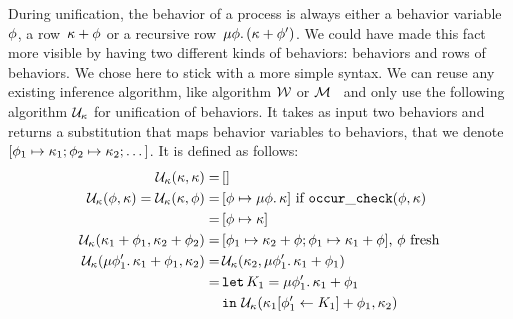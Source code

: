 \documentclass[9pt,preprint]{sigplanconf}
\begin{document}
During unification, the behavior of a process is always either a behavior variable~$\phi$, a row~$\kappa + \phi$ or a recursive row~$\mu \phi.\, (\kappa + \phi')$. We could have made this fact more visible by having two different kinds of behaviors: behaviors and rows of behaviors. We chose here to stick with a more simple syntax. We can reuse any existing inference algorithm, like algorithm $\mathcal{W}$ or $\mathcal{M}$~\cite{Lee:1998a} and only use the following algorithm $\mathcal{U}_{\kappa}$ for unification of behaviors. It takes as input two behaviors and returns a substitution that maps behavior variables to behaviors, that we denote $[\phi_1 \mapsto \kappa_1; \phi_2 \mapsto \kappa_2; \dots]$. It is defined as follows:
%
\begin{align*}
\mathcal{U}_{\kappa}(\kappa, \kappa) =&\, [] \\
\mathcal{U}_{\kappa}(\phi, \kappa) = \mathcal{U}_{\kappa}(\kappa, \phi) =
					&\, [\phi \mapsto  \mu \phi.\, \kappa ]  \text{ if } \mathtt{occur\_check}(\phi, \kappa) \\
					= &\,  [\phi \mapsto \kappa] \\
\mathcal{U}_{\kappa}(\kappa_1 + \phi_1, \kappa_2 + \phi_2) =&\,
                  [\phi_1 \mapsto \kappa_2 + \phi;  \phi_1 \mapsto \kappa_1 + \phi ]  \text{, } \phi \text{ fresh} \\
\mathcal{U}_{\kappa}(\mu \phi'_1.\, \kappa_1 + \phi_1, \kappa_2) 
    = &\, \mathcal{U}_{\kappa}(\kappa_2, \mu \phi'_1.\, \kappa_1 + \phi_1) \\ 
    = &\, \mathtt{let}\, K_1 = \mu \phi'_1.\, \kappa_1 + \phi_1 \\
    &\, \mathtt{in}\,\, \mathcal{U}_{\kappa}( \kappa_1[\phi'_1 \leftarrow K_1] + \phi_1 , \kappa_2) \\
\end{align*}
\end{document}
